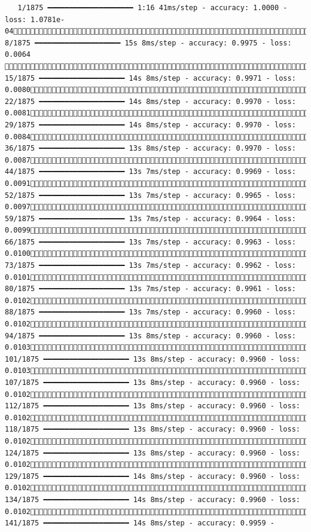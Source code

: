 \documentclass[
  letterpaper,
  DIV=11,
  numbers=noendperiod]{scrreprt}
\begin{document}
\begin{verbatim}
   1/1875 ━━━━━━━━━━━━━━━━━━━━ 1:16 41ms/step - accuracy: 1.0000 - loss: 1.0781e-04   8/1875 ━━━━━━━━━━━━━━━━━━━━ 15s 8ms/step - accuracy: 0.9975 - loss: 0.0064        15/1875 ━━━━━━━━━━━━━━━━━━━━ 14s 8ms/step - accuracy: 0.9971 - loss: 0.0080  22/1875 ━━━━━━━━━━━━━━━━━━━━ 14s 8ms/step - accuracy: 0.9970 - loss: 0.0081  29/1875 ━━━━━━━━━━━━━━━━━━━━ 14s 8ms/step - accuracy: 0.9970 - loss: 0.0084  36/1875 ━━━━━━━━━━━━━━━━━━━━ 13s 8ms/step - accuracy: 0.9970 - loss: 0.0087  44/1875 ━━━━━━━━━━━━━━━━━━━━ 13s 7ms/step - accuracy: 0.9969 - loss: 0.0091  52/1875 ━━━━━━━━━━━━━━━━━━━━ 13s 7ms/step - accuracy: 0.9965 - loss: 0.0097  59/1875 ━━━━━━━━━━━━━━━━━━━━ 13s 7ms/step - accuracy: 0.9964 - loss: 0.0099  66/1875 ━━━━━━━━━━━━━━━━━━━━ 13s 7ms/step - accuracy: 0.9963 - loss: 0.0100  73/1875 ━━━━━━━━━━━━━━━━━━━━ 13s 7ms/step - accuracy: 0.9962 - loss: 0.0101  80/1875 ━━━━━━━━━━━━━━━━━━━━ 13s 7ms/step - accuracy: 0.9961 - loss: 0.0102  88/1875 ━━━━━━━━━━━━━━━━━━━━ 13s 7ms/step - accuracy: 0.9960 - loss: 0.0102  94/1875 ━━━━━━━━━━━━━━━━━━━━ 13s 8ms/step - accuracy: 0.9960 - loss: 0.0103 101/1875 ━━━━━━━━━━━━━━━━━━━━ 13s 8ms/step - accuracy: 0.9960 - loss: 0.0103 107/1875 ━━━━━━━━━━━━━━━━━━━━ 13s 8ms/step - accuracy: 0.9960 - loss: 0.0102 112/1875 ━━━━━━━━━━━━━━━━━━━━ 13s 8ms/step - accuracy: 0.9960 - loss: 0.0102 118/1875 ━━━━━━━━━━━━━━━━━━━━ 13s 8ms/step - accuracy: 0.9960 - loss: 0.0102 124/1875 ━━━━━━━━━━━━━━━━━━━━ 13s 8ms/step - accuracy: 0.9960 - loss: 0.0102 129/1875 ━━━━━━━━━━━━━━━━━━━━ 14s 8ms/step - accuracy: 0.9960 - loss: 0.0102 134/1875 ━━━━━━━━━━━━━━━━━━━━ 14s 8ms/step - accuracy: 0.9960 - loss: 0.0102 141/1875 ━━━━━━━━━━━━━━━━━━━━ 14s 8ms/step - accuracy: 0.9959 - 
\end{verbatim}
\end{document}
